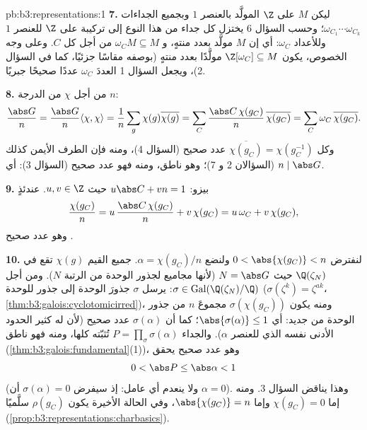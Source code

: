 \begin{solution}{pb:b3:representations:1}
\textbf{7.} ليكن $M$  على $\Z$ المولَّد بالعنصر $1$ وبجميع
الجداءات $\omega_{C_1}\cdots\omega_{C_k}$؛ وحسب السؤال 6 يختزل كل جداء من هذا النوع إلى
تركيبة على $\Z$ للعنصر $1$ وللأعداد $\omega_C$: أي إن $M$
مولَّد بعدد منتهٍ، و $\omega_C M
\subseteq M$ من أجل كل $C$. وعلى وجه الخصوص،
يكون $\Z[\omega_C]
\subseteq M$ مولَّدًا بعدد منتهٍ (بوصفه مقاسًا جزئيًا، كما في
السؤال 2)، ويجعل السؤال 1 العددَ $\omega_C$ عددًا صحيحًا جبريًا.

\textbf{8.} من أجل $\chi$  من الدرجة $n$:
\[
\frac{\abs G}{n} = \frac{\abs G}{n}\langle\chi,\chi\rangle
= \frac1n \sum_{g}\chi(g)\overline{\chi(g)}
= \sum_{C}\frac{\abs C\,\chi(g_C)}{n}\,\overline{\chi(g_C)}
= \sum_C \omega_C\,\overline{\chi(g_C)} .
\]
وكل $\overline{\chi(g_C)} = \chi(g_C^{-1})$ عدد صحيح  (السؤال 4)، ومنه فإن الطرف الأيمن
كذلك (السؤالان 2 و 7)؛ وهو ناطق، ومنه فهو عدد صحيح (السؤال 3):
أي $n \mid \abs
G$.

\textbf{9.} بيزو: $u\abs C + vn = 1$ حيث $u, v \in \Z$. عندئذٍ
\[
\frac{\chi(g_C)}{n} = u\,\frac{\abs C\,\chi(g_C)}{n} +
v\,\chi(g_C) = u\,\omega_C + v\,\chi(g_C),
\]
وهو عدد صحيح .

\textbf{10.} لنفترض $0 < \abs{\chi(g_C)} < n$ ولنضع $\alpha
= \chi(g_C)/n$. جميع القيم $\chi(g)$
تقع في $\Q(\zeta_N)$ حيث $N =
\abs G$ (لأنها مجاميع لجذور الوحدة من
الرتبة $N$). ومن أجل $\sigma \in
\operatorname{Gal}(\Q(\zeta_N)/\Q)$: يرسل $\sigma$ جذورَ الوحدة إلى
جذور للوحدة ($\sigma(\zeta^k) = \zeta^{ak}$، \cref{thm:b3:galois:cyclotomicirred})، ومنه يكون $\sigma(\chi(g_C))$ مجموعَ
$n$ من جذور الوحدة من جديد: أي $\abs{\sigma(\alpha)}
\leq 1$؛ كما أن $\sigma(\alpha)$
عدد صحيح  (لأن له كثير الحدود الأدنى نفسه الذي للعنصر $\alpha$).
والجداء $P =
\prod_\sigma \sigma(\alpha)$ تُثبّته  كلها، ومنه فهو ناطق
(\cref{thm:b3:galois:fundamental}(1))، وهو عدد صحيح  يحقق
\[
0 < \abs P \leq \abs\alpha < 1
\]
(ولا ينعدم أي عامل: إذ سيفرض $\sigma(\alpha) = 0$ أن $\alpha =
0$). وهذا يناقض
السؤال 3. ومنه إما $\chi(g_C) = 0$ وإما $\abs{\chi(g_C)} = n$، وفي الحالة
الأخيرة يكون $\rho(g_C)$ سلَّميًا (\cref{prop:b3:representations:charbasics}).


\end{solution}
